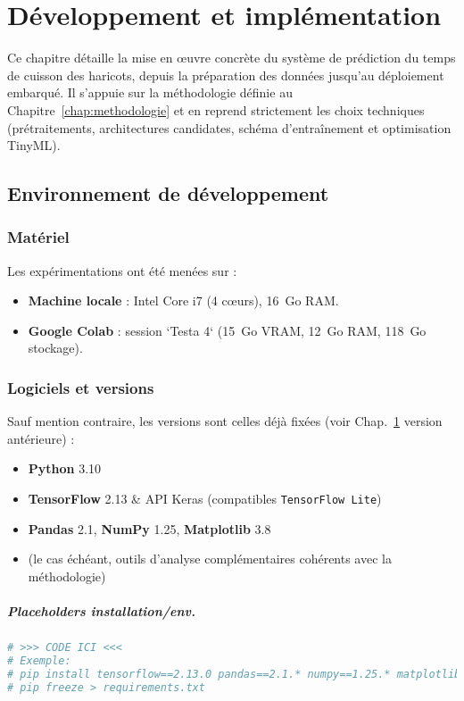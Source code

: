 \chapter{Développement et implémentation}
\label{chap:developpement}

Ce chapitre détaille la mise en œuvre concrète du système de prédiction du temps de cuisson des haricots, depuis la préparation des données jusqu’au déploiement embarqué. Il s’appuie sur la méthodologie définie au Chapitre~\ref{chap:methodologie} et en reprend strictement les choix techniques (prétraitements, architectures candidates, schéma d’entraînement et optimisation TinyML).

\section{Environnement de développement}
\label{sec:env_dev}

\subsection{Matériel}
Les expérimentations ont été menées sur :
\begin{itemize}
    \item \textbf{Machine locale} : Intel Core i7 (4 cœurs), 16~Go RAM.
    \item \textbf{Google Colab} : session `Testa 4` (15~Go VRAM, 12~Go RAM, 118~Go stockage).
\end{itemize}

\subsection{Logiciels et versions}
Sauf mention contraire, les versions sont celles déjà fixées (voir Chap.~\ref{chap:developpement} version antérieure) :
\begin{itemize}
    \item \textbf{Python} 3.10
    \item \textbf{TensorFlow} 2.13 \& API Keras (compatibles \texttt{TensorFlow Lite})
    \item \textbf{Pandas} 2.1, \textbf{NumPy} 1.25, \textbf{Matplotlib} 3.8
    \item (le cas échéant, outils d’analyse complémentaires cohérents avec la méthodologie)
\end{itemize}

\paragraph{Placeholders installation/env.}
\begin{lstlisting}[language=bash,caption={(Placeholder) Installation/gel des dépendances},label={lst:env_install}]
# >>> CODE ICI <<<
# Exemple:
# pip install tensorflow==2.13.0 pandas==2.1.* numpy==1.25.* matplotlib==3.8.*
# pip freeze > requirements.txt
\end{lstlisting}

